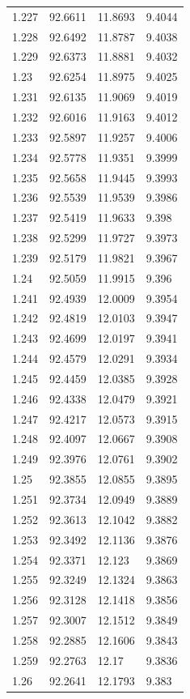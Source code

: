 \begin{tabular}{llll}
1.227 & 92.6611 & 11.8693 & 9.4044 \\
1.228 & 92.6492 & 11.8787 & 9.4038 \\
1.229 & 92.6373 & 11.8881 & 9.4032 \\
1.23 & 92.6254 & 11.8975 & 9.4025 \\
1.231 & 92.6135 & 11.9069 & 9.4019 \\
1.232 & 92.6016 & 11.9163 & 9.4012 \\
1.233 & 92.5897 & 11.9257 & 9.4006 \\
1.234 & 92.5778 & 11.9351 & 9.3999 \\
1.235 & 92.5658 & 11.9445 & 9.3993 \\
1.236 & 92.5539 & 11.9539 & 9.3986 \\
1.237 & 92.5419 & 11.9633 & 9.398 \\
1.238 & 92.5299 & 11.9727 & 9.3973 \\
1.239 & 92.5179 & 11.9821 & 9.3967 \\
1.24 & 92.5059 & 11.9915 & 9.396 \\
1.241 & 92.4939 & 12.0009 & 9.3954 \\
1.242 & 92.4819 & 12.0103 & 9.3947 \\
1.243 & 92.4699 & 12.0197 & 9.3941 \\
1.244 & 92.4579 & 12.0291 & 9.3934 \\
1.245 & 92.4459 & 12.0385 & 9.3928 \\
1.246 & 92.4338 & 12.0479 & 9.3921 \\
1.247 & 92.4217 & 12.0573 & 9.3915 \\
1.248 & 92.4097 & 12.0667 & 9.3908 \\
1.249 & 92.3976 & 12.0761 & 9.3902 \\
1.25 & 92.3855 & 12.0855 & 9.3895 \\
1.251 & 92.3734 & 12.0949 & 9.3889 \\
1.252 & 92.3613 & 12.1042 & 9.3882 \\
1.253 & 92.3492 & 12.1136 & 9.3876 \\
1.254 & 92.3371 & 12.123 & 9.3869 \\
1.255 & 92.3249 & 12.1324 & 9.3863 \\
1.256 & 92.3128 & 12.1418 & 9.3856 \\
1.257 & 92.3007 & 12.1512 & 9.3849 \\
1.258 & 92.2885 & 12.1606 & 9.3843 \\
1.259 & 92.2763 & 12.17 & 9.3836 \\
1.26 & 92.2641 & 12.1793 & 9.383 \\

\end{tabular}
